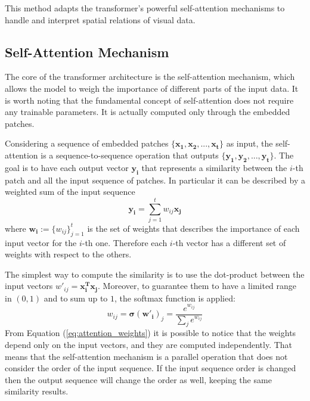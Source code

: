 This method adapts the transformer's powerful self-attention mechanisms to 
handle and interpret spatial relations of visual data.


\subsection{Self-Attention Mechanism}
The core of the transformer architecture is the self-attention mechanism, which 
allows the model to weigh the importance of different parts of the input data.
It is worth noting that the fundamental concept of self-attention does not 
require any trainable parameters. It is actually computed only through the 
embedded patches.

Considering a sequence of embedded patches $\{\boldsymbol{x_1, x_2, ..., x_t}\}$ 
as input, the self-attention is a sequence-to-sequence operation that outputs
$\{\boldsymbol{y_1, y_2, ..., y_t}\}$. The goal is to have each output vector 
$\boldsymbol{y_i}$ that represents a similarity between the $i$-th 
patch and all the input sequence of patches. In particular it can be described by a  
weighted sum of the input sequence
\begin{equation}
\boldsymbol{y_i} = \sum_{j=1}^{t} w_{ij} \boldsymbol{x_j}
\label{eq:self_attention_output}
\end{equation}
where $\boldsymbol{w_i}:=\{w_{ij}\}_{j=1}^t$ is the set of weights that describes the importance 
of each input vector for the $i$-th one. 
Therefore each $i$-th vector has a different set of weights with respect to 
the others.

The simplest way to compute the similarity is to use the dot-product between the 
input vectors $w'_{ij} = \boldsymbol{x_i^T x_j}$. Moreover, to guarantee them to have a limited 
range in $(0, 1)$ and to sum up to $1$, the softmax function is applied:
\begin{equation}
    w_{ij} = \boldsymbol{\sigma}(\boldsymbol{w'_i})_j = 
    \frac{e^{w_{ij}}}{\sum_{j} e^{w_{ij}}}
    \label{eq:attention_weights}
\end{equation}
From Equation (\ref{eq:attention_weights}) it is possible to notice that the 
weights depend only on the input vectors, and they are computed independently. 
That means that the self-attention mechanism is a parallel operation that does 
not consider the order of the input sequence. If the input sequence order is 
changed then the output sequence will change the order as well, keeping the 
same similarity results.

